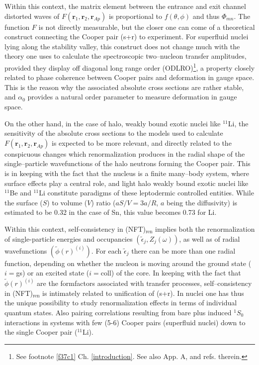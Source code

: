Within this context, the matrix element between the entrance and exit channel distorted waves of $F(\mathbf r_1,\mathbf r_2,\mathbf r_{Ap})$ is proportional to $f(\theta,\phi)$ and thus $\Phi_{mn}$. The function $F$ is not directly measurable, but the closer one can come of a theoretical construct connecting the Cooper pair (s+r) to experiment. For superfluid nuclei lying along the stability valley, this construct does not change much with the theory one uses to calculate the spectroscopic two--nucleon transfer amplitudes,  provided they display off diagonal long range order (ODLRO)\footnote{See footnote \ref{f37c1} Ch. \ref{introduction}. See also App. A, \cite{Potel:17} and refs. therein.}, a property closely related to phase coherence between Cooper pairs and deformation in gauge space. This is the reason why the associated absolute cross sections are rather stable, and $\alpha_0$ provides a natural order parameter to measure deformation in gauge space.


On the other hand, in the case of halo, weakly bound exotic nuclei like $^{11}$Li, the sensitivity of the absolute cross sections to the models used to calculate $F(\mathbf r_1,\mathbf r_2,\mathbf r_{Ap})$ is expected to be more relevant, and directly related to the conspicuous changes which renormalization produces in the radial shape of the single--particle wavefunctions of the halo neutrons forming the Cooper pair. This is in keeping with  the fact that the nucleus is a finite many--body system, where surface effects play a central role, and light halo weakly bound exotic nuclei like $^{11}$Be and $^{11}$Li constitute paradigms of these leptodermic controlled entities.  While the surface ($S$) to volume ($V$) ratio ($aS/V=3a/R$, $a$ being the diffusivity) is estimated to be 0.32 in the case of Sn, this value becomes 0.73 for Li.

Within this context, self-consistency in (NFT)$_{\text{ren}}$ implies both the renormalization of single-particle energies and occupancies $(\tilde\epsilon_j,Z_j(\omega))$, as well as of radial wavefunctions $(\tilde\phi(r)^{(i)})$. For each $\tilde\epsilon_j$ there can be more than one radial function, depending on whether the nucleon is moving around the ground state ($i=$gs) or an excited state ($i=$coll) of the core. In keeping with the fact that $\tilde{\phi}(r)^{(i)}$ are the formfactors associated with transfer processes, self--consistency in (NFT)$_{\text{ren}}$ is intimately related to unification of (s+r). In nuclei one has thus the unique possibility to study renormalization effects in terms of individual quantum states. Also pairing correlations resulting from bare plus induced $^1S_0$ interactions in systems with few (5-6) Cooper pairs (superfluid nuclei) down to the single Cooper pair ($^{11}$Li).
